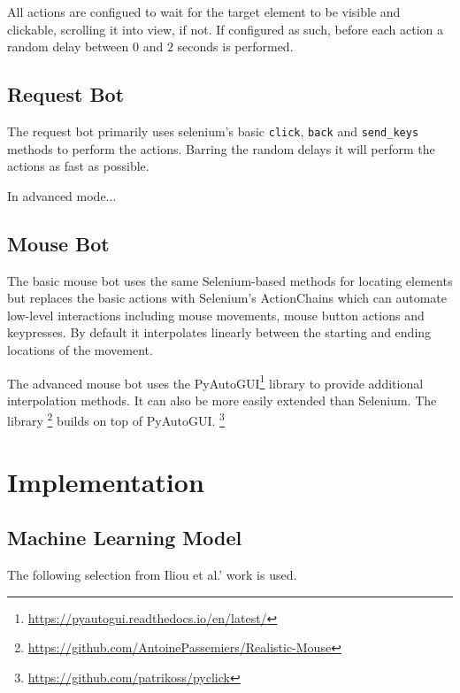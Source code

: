 \documentclass[
    fontsize=12pt,
    headings=small,
    parskip=half,           %
    bibliography=totoc,
    numbers=noenddot,       %
    open=any,               %
    final                   %
]{scrreprt}
\begin{document}
All actions are configued to wait for the target element to be visible and clickable, scrolling it into view, if not. If configured as such, before each action a random delay between $0$ and $2$ seconds is performed.

\section{Request Bot}

The request bot primarily uses selenium's basic \lstinline{click}, \lstinline{back} and \lstinline{send_keys} methods to perform the actions. Barring the random delays it will perform the actions as fast as possible.

In advanced mode... \todo

\section{Mouse Bot}

The basic mouse bot uses the same Selenium-based methods for locating elements but replaces the basic actions with Selenium's ActionChains which can automate low-level interactions including mouse movements, mouse button actions and keypresses. By default it interpolates linearly between the starting and ending locations of the movement.

The advanced mouse bot uses the PyAutoGUI\footnote{\url{https://pyautogui.readthedocs.io/en/latest/}} library to provide additional interpolation methods. It can also be more easily extended than Selenium.
The library \footnote{\url{https://github.com/AntoinePassemiers/Realistic-Mouse}} builds on top of PyAutoGUI.
\footnote{\url{https://github.com/patrikoss/pyclick}}

\chapter{Implementation}


\section{Machine Learning Model}
\label{machine_learning_model}

The following selection from Iliou et al.' work \cite{10.1145/3339252.3339267} is used.
\end{document}
